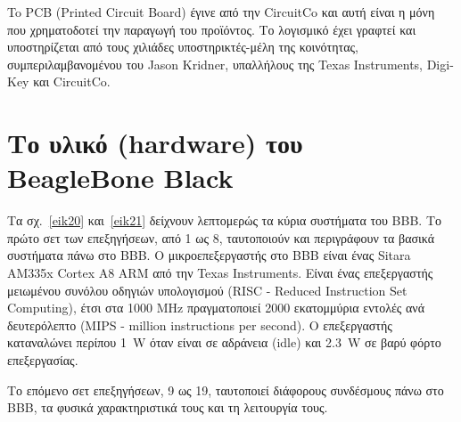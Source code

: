 \documentclass[12pt, a4paper, oneside]{report}
\begin{document}
To PCB (Printed Circuit Board) έγινε από την CircuitCo και αυτή είναι η μόνη που χρηματοδοτεί την παραγωγή του προϊόντος. Το λογισμικό έχει γραφτεί και υποστηρίζεται από τους χιλιάδες υποστηρικτές-μέλη της κοινότητας, συμπεριλαμβανομένου του Jason Kridner, υπαλλήλους της Texas Instruments, Digi-Key και CircuitCo.

\section{Το υλικό (hardware) του BeagleBone Black}

Τα σχ.~\ref{eik20} και~\ref{eik21} δείχνουν λεπτομερώς τα κύρια συστήματα του BBB. Το πρώτο σετ των επεξηγήσεων, από 1 ως 8, ταυτοποιούν και περιγράφουν τα βασικά συστήματα πάνω στο BBB. Ο μικροεπεξεργαστής στο BBB είναι ένας Sitara AM335x Cortex A8 ARM από την Texas Instruments. Είναι ένας επεξεργαστής μειωμένου συνόλου οδηγιών υπολογισμού (RISC - Reduced Instruction Set Computing), έτσι στα 1000 MHz πραγματοποιεί 2000 εκατομμύρια εντολές ανά δευτερόλεπτο (MIPS - million instructions per second). Ο επεξεργαστής καταναλώνει περίπου 1~W όταν είναι σε αδράνεια (idle) και 2.3~W σε βαρύ φόρτο επεξεργασίας.

Το επόμενο σετ επεξηγήσεων, 9 ως 19, ταυτοποιεί διάφορους συνδέσμους πάνω στο BBB, τα φυσικά χαρακτηριστικά τους και τη λειτουργία τους.
\end{document}
